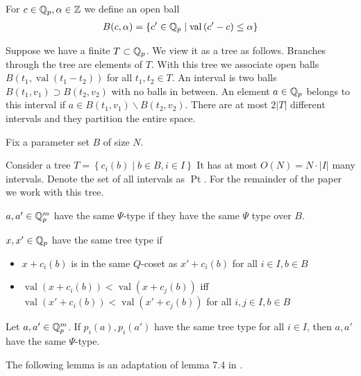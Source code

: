 \documentclass{amsart}
\newcommand{\curly}[1]{\left\{#1\right\}}
\newcommand{\paren}[1]{\left(#1\right)}
\DeclareMathOperator{\Pt}{Pt}
\DeclareMathOperator{\val}{val}
\begin{document}
\begin{Definition}
	For $c \in \mathbb{Q}_p, \alpha \in \mathbb{Z}$ we define an open ball 
	\begin{align*}
		B(c, \alpha) = \curly{c' \in \Q_p \mid \val \paren{c' - c} \leq \alpha}
	\end{align*}
\end{Definition}

\begin{Definition}
	Suppose we have a finite $T \subset \mathbb{Q}_p$.
	We view it as a tree as follows.
	Branches through the tree are elements of $T$.
	With this tree we associate open balls $B(t_1, \val(t_1 - t_2))$ for all $t_1, t_2 \in T$.
	An interval is two balls $B(t_1, v_1) \supset B(t_2, v_2)$ with no balls in between.
	An element $a \in \mathbb{Q}_p$ belongs to this interval if $a \in B(t_1, v_1) \backslash B(t_2, v_2)$.
	There are at most $2|T|$ different intervals and they partition the entire space.
	
	Fix a parameter set $B$ of size $N$.
	
	Consider a tree $T = \curly{c_i(b) \mid b \in B, i \in I}$
	It has at most $O(N) = N \cdot |I|$ many intervals.
	Denote the set of all intervals as $\Pt$.
	For the remainder of the paper we work with this tree.	
\end{Definition}


\begin{Definition}
	$a, a' \in \mathbb{Q}_p^m$ have the same $\Psi$-type if they have the same $\Psi$ type over $B$.	
\end{Definition}

\begin{Definition}
	$x, x' \in \mathbb{Q}_p$ have the same tree type if
	\begin{itemize}
		\item $x + c_i(b)$ is in the same $Q$-coset as $x' + c_i(b)$ for all $i \in I, b \in B$
		\item $\val(x + c_i(b)) < \val(x + c_j(b))$ iff $\val(x' + c_i(b)) < \val(x' + c_j(b))$ for all $i,j \in I, b \in B$
	\end{itemize}
\end{Definition}
 
\begin{Lemma}
	Let $a, a' \in \mathbb{Q}_p^m$.
	If $p_i(a), p_i(a')$ have the same tree type for all $i \in I$, then $a, a'$ have the same $\Psi$-type.
\end{Lemma}

The following lemma is an adaptation of lemma 7.4 in \cite{density}.
\end{document}
